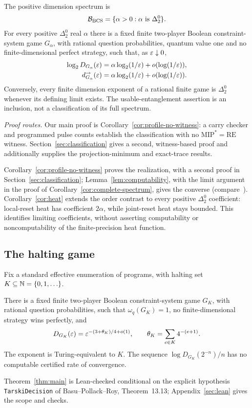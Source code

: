 \begin{theorem}\label{thm:realization}
The positive dimension spectrum is
\[
 \mathcal B_{\rm BCS}=\{\alpha>0:\alpha\text{ is }\Delta^0_2\}.
\]
For every positive $\Delta^0_2$ real $\alpha$ there is a fixed finite two-player Boolean constraint-system game $G_\alpha$, with rational question probabilities, quantum value one and no finite-dimensional perfect strategy, such that, as $\varepsilon\downarrow0$,
\begin{align}
 \log_2D_{G_\alpha}(\varepsilon)&=\alpha\log_2(1/\varepsilon)+o(\log(1/\varepsilon)),\label{eq:realization-dimension}\\
 d^\to_{G_\alpha}(\varepsilon)&=\alpha\log_2(1/\varepsilon)+o(\log(1/\varepsilon)).\label{eq:realization-usable}
\end{align}
Conversely, every finite dimension exponent of a rational finite game is $\Delta^0_2$ whenever its defining limit exists. The usable-entanglement assertion is an inclusion, not a classification of its full spectrum.
\end{theorem}
\medskip\noindent\textit{Proof routes.} Our main proof is Corollary~\ref{cor:profile-no-witness}: a carry checker and programmed pulse counts establish the classification with no $\mathrm{MIP}^*=\mathrm{RE}$ witness. Section~\ref{sec:classification} gives a second, witness-based proof and additionally supplies the projection-minimum and exact-trace results.


Corollary~\ref{cor:profile-no-witness} proves the realization, with a second proof in Section~\ref{sec:classification}; Lemma~\ref{lem:computability}, with the limit argument in the proof of Corollary~\ref{cor:complete-spectrum}, gives the converse (compare~\cite[Proposition~11.13]{DM-precision}). Corollary~\ref{cor:heat} extends the order contrast to every positive $\Delta^0_2$ coefficient: local-reset heat has coefficient $2\alpha$, while joint-reset heat stays bounded. This identifies limiting coefficients, without asserting computability or noncomputability of the finite-precision heat function.

\subsection{The halting game}
Fix a standard effective enumeration of programs, with halting set $K\subseteq\mathbb N=\{0,1,\ldots\}$.
\begin{theorem}\label{thm:main}
There is a fixed finite two-player Boolean constraint-system game $G_K$, with rational question probabilities, such that $\omega_q(G_K)=1$, no finite-dimensional strategy wins perfectly, and
\begin{equation}\label{eq:main}
 D_{G_K}(\varepsilon)=\varepsilon^{-(3+\theta_K)/4+o(1)},\qquad
 \theta_K=\sum_{e\in K}4^{-(e+1)}.
\end{equation}
The exponent is Turing-equivalent to $K$. The sequence $\log D_{G_K}(2^{-n})/n$ has no computable certified rate of convergence.
\end{theorem}
Theorem~\ref{thm:main} is Lean-checked conditional on the explicit hypothesis \texttt{TarskiDecision} of Basu--Pollack--Roy, Theorem~13.13; Appendix~\ref{sec:lean} gives the scope and checks.


